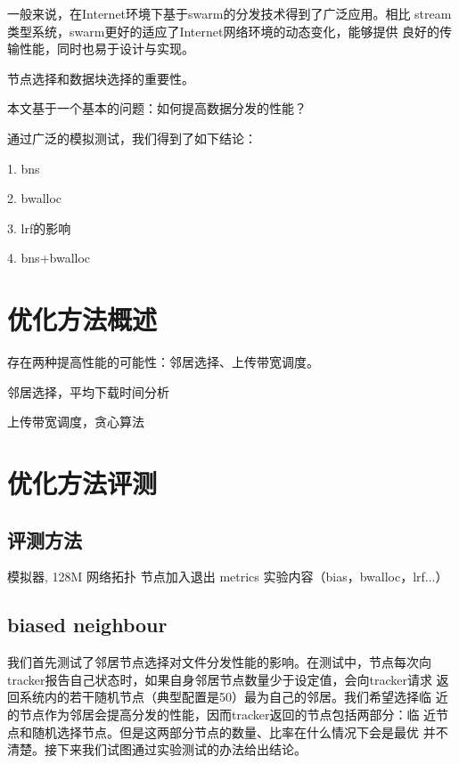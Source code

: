 一般来说，在Internet环境下基于swarm的分发技术得到了广泛应用。相比
stream类型系统，swarm更好的适应了Internet网络环境的动态变化，能够提供
良好的传输性能，同时也易于设计与实现。

节点选择和数据块选择的重要性。

本文基于一个基本的问题：如何提高数据分发的性能？


通过广泛的模拟测试，我们得到了如下结论：

1. bns

2. bwalloc

3. lrf的影响

4. bns+bwalloc


\section{优化方法概述}

存在两种提高性能的可能性：邻居选择、上传带宽调度。

邻居选择，平均下载时间分析

上传带宽调度，贪心算法


\section{优化方法评测}

\subsection{评测方法}
模拟器, 128M
网络拓扑
节点加入退出
metrics
实验内容（bias，bwalloc，lrf...）

\subsection{biased neighbour}


我们首先测试了邻居节点选择对文件分发性能的影响。在测试中，节点每次向
tracker报告自己状态时，如果自身邻居节点数量少于设定值，会向tracker请求
返回系统内的若干随机节点（典型配置是50）最为自己的邻居。我们希望选择临
近的节点作为邻居会提高分发的性能，因而tracker返回的节点包括两部分：临
近节点和随机选择节点。但是这两部分节点的数量、比率在什么情况下会是最优
并不清楚。接下来我们试图通过实验测试的办法给出结论。

